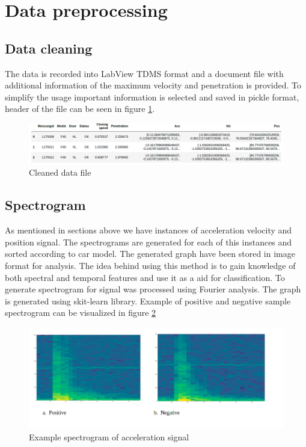     \section{Data preprocessing}
    \subsection{Data cleaning}
    The data is recorded into LabView TDMS format and a document file with additional information of the maximum velocity and penetration is provided. To simplify the usage important information is selected and saved in pickle format, header of the file can be seen in figure \ref{n8}.
    
     \begin{figure}[h]
     	\centering
     	\includegraphics[width=1\linewidth]{images/pickle.png}
     	\caption{Cleaned data file}
     	\label{n8}
     \end{figure}
     
     
    \subsection{Spectrogram}
    As mentioned in sections above we have instances of acceleration velocity and position signal. The spectrograms are generated for each of this instances and sorted according to car model. The generated graph have been stored in image format for analysis. The idea behind using this method is to gain knowledge of both spectral and temporal features and use it as a aid for classification. 
    To generate spectrogram for signal was processed using Fourier analysis. The graph is generated using skit-learn library.
    Example of positive and negative sample spectrogram can be visualized in figure \ref{n9}
    
    \begin{figure}[h]
    	\centering
    	\includegraphics[width=1\linewidth]{images/spec1.png}
    	\caption{Example spectrogram of acceleration signal }
    	\label{n9}
    \end{figure}
  



